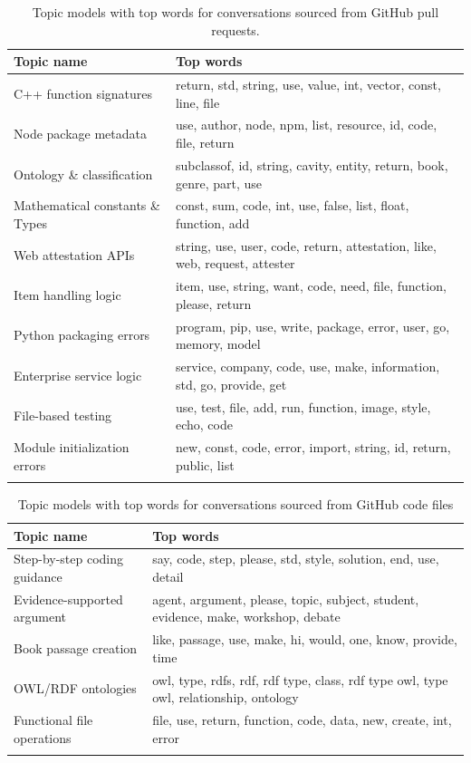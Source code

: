 \begin{longtable}{|m{5cm}|m{7cm}|}
    \hline
    \textbf{Topic name} & \textbf{Top words}  \\
    \hline
    \hline
        C++ function signatures & return, std, string, use, value, int, vector, const, line, file \\
    \hline
        Node package metadata & use, author, node, npm, list, resource, id, code, file, return \\
    \hline
        Ontology \& classification & subclassof, id, string, cavity, entity, return, book, genre, part, use \\
    \hline
        Mathematical constants \& Types & const, sum, code, int, use, false, list, float, function, add \\
    \hline
        Web attestation APIs & string, use, user, code, return, attestation, like, web, request, attester \\
    \hline
        Item handling logic & item, use, string, want, code, need, file, function, please, return \\
    \hline
        Python packaging errors & program, pip, use, write, package, error, user, go, memory, model \\
    \hline
        Enterprise service logic & service, company, code, use, make, information, std, go, provide, get \\
    \hline
        File-based testing & use, test, file, add, run, function, image, style, echo, code \\
    \hline
        Module initialization errors & new, const, code, error, import, string, id, return, public, list \\
    \hline
\caption{Topic models with top words for conversations sourced from GitHub pull requests.}
\label{table:pr-topics}
\end{longtable}

\pagebreak

\begin{longtable}{|m{4cm}|m{8cm}|}
    \hline
    \textbf{Topic name} & \textbf{Top words}  \\
    \hline
    \hline
        Step-by-step coding guidance & say, code, step, please, std, style, solution, end, use, detail \\
    \hline
        Evidence-supported argument & agent, argument, please, topic, subject, student, evidence, make, workshop, debate \\
    \hline
        Book passage creation & like, passage, use, make, hi, would, one, know, provide, time \\
    \hline
        OWL/RDF ontologies & owl, type, rdfs, rdf, rdf type, class, rdf type owl, type owl, relationship, ontology \\
    \hline
        Functional file operations & file, use, return, function, code, data, new, create, int, error \\
    \hline
\caption{Topic models with top words for conversations sourced from GitHub code files}
\label{table:code-files-topics}
\end{longtable}

